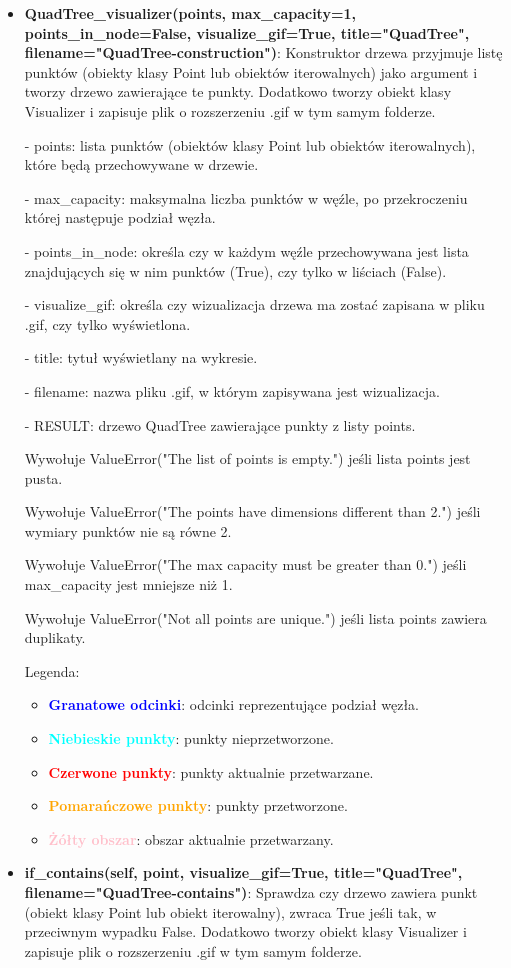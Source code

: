 \documentclass{lab}
\begin{document}
\begin{itemize}
  \item \textbf{QuadTree\_visualizer(points, max\_capacity=1, points\_in\_node=False, visualize\_gif=True, title="QuadTree", filename="QuadTree-construction")}:
  Konstruktor drzewa przyjmuje listę punktów (obiekty klasy Point lub obiektów iterowalnych) jako argument i tworzy drzewo zawierające te punkty. Dodatkowo tworzy obiekt klasy Visualizer i zapisuje plik o rozszerzeniu .gif w tym samym folderze.

  - points: lista punktów (obiektów klasy Point lub obiektów iterowalnych), które będą przechowywane w drzewie.

  - max\_capacity: maksymalna liczba punktów w węźle, po przekroczeniu której następuje podział węzła.

  - points\_in\_node: określa czy w każdym węźle przechowywana jest lista znajdujących się w nim punktów (True), czy tylko w liściach (False).

  - visualize\_gif: określa czy wizualizacja drzewa ma zostać zapisana w pliku .gif, czy tylko wyświetlona.

  - title: tytuł wyświetlany na wykresie.

  - filename: nazwa pliku .gif, w którym zapisywana jest wizualizacja.

  - RESULT: drzewo QuadTree zawierające punkty z listy points.

  Wywołuje ValueError("The list of points is empty.") jeśli lista points jest pusta.

  Wywołuje ValueError("The points have dimensions different than 2.") jeśli wymiary punktów nie są równe 2.

  Wywołuje ValueError("The max capacity must be greater than 0.") jeśli max\_capacity jest mniejsze niż 1.

  Wywołuje ValueError("Not all points are unique.") jeśli lista points zawiera duplikaty.

  Legenda:
  \begin{itemize}
      \item \textbf{\textcolor{blue}{Granatowe odcinki}}: odcinki reprezentujące podział węzła.
      \item \textbf{\textcolor{cyan}{Niebieskie punkty}}: punkty nieprzetworzone.
      \item \textbf{\textcolor{red}{Czerwone punkty}}: punkty aktualnie przetwarzane.
      \item \textbf{\textcolor{orange}{Pomarańczowe punkty}}: punkty przetworzone.
      \item \textbf{\textcolor{pink}{Żółty obszar}}: obszar aktualnie przetwarzany.
  \end{itemize}
  \item \textbf{if\_contains(self, point, visualize\_gif=True, title="QuadTree", filename="QuadTree-contains")}:
  Sprawdza czy drzewo zawiera punkt (obiekt klasy Point lub obiekt iterowalny), zwraca True jeśli tak, w przeciwnym wypadku False. Dodatkowo tworzy obiekt klasy Visualizer i zapisuje plik o rozszerzeniu .gif w tym samym folderze.


\end{itemize}
\end{document}
